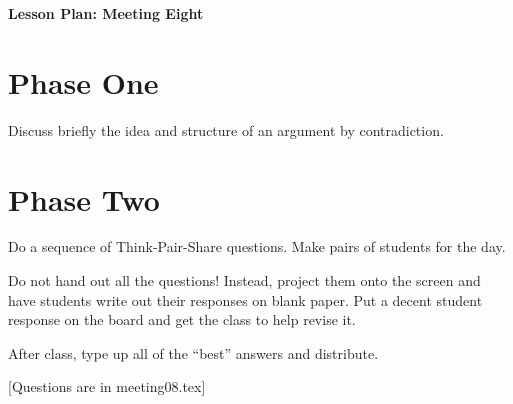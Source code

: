 \documentclass[12pt]{amsart}
\theoremstyle{definition}
\begin{document}
\begin{center}
\textbf{\Huge
Lesson Plan: Meeting Eight
}
\end{center}
\vspace{.5in}

\section{Phase One}
Discuss briefly the idea and structure of an argument by contradiction.

\section{Phase Two}
Do a sequence of Think-Pair-Share questions. 
Make pairs of students for the day.

Do not hand out all the questions!
Instead, project them onto the screen and have students write out their responses on blank paper. 
Put a decent student response on the board and get the class to help revise it.

After class, type up all of the ``best'' answers and distribute.

[Questions are in meeting08.tex]
\end{document}
